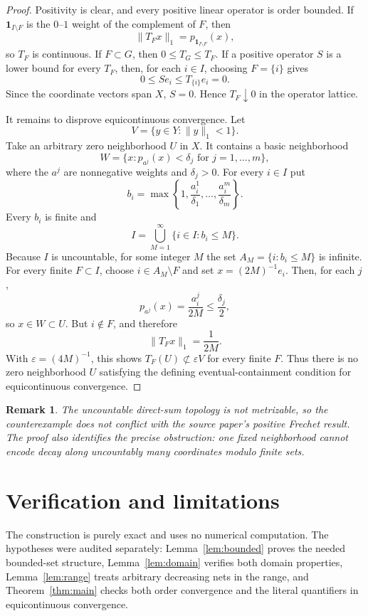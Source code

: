 \documentclass[11pt]{article}
\newtheorem{remark}[theorem]{Remark}
\begin{document}
\begin{proof}
Positivity is clear, and every positive linear operator is order bounded.  If
$\mathbf 1_{I\setminus F}$ is the $0$--$1$ weight of the complement of $F$,
then
\[
   \|T_Fx\|_1=p_{\mathbf 1_{I\setminus F}}(x),
\]
so $T_F$ is continuous.  If $F\subset G$, then $0\le T_G\le T_F$.  If a
positive operator $S$ is a lower bound for every $T_F$, then, for each
$i\in I$, choosing $F=\{i\}$ gives
\[
   0\le S e_i\le T_{\{i\}}e_i=0.
\]
Since the coordinate vectors span $X$, $S=0$.  Hence $T_F\downarrow0$ in the
operator lattice.

It remains to disprove equicontinuous convergence.  Let
\[
   V=\{y\in Y:\|y\|_1<1\}.
\]
Take an arbitrary zero neighborhood $U$ in $X$.  It contains a basic
neighborhood
\[
   W=\{x:p_{a^j}(x)<\delta_j\text{ for }j=1,\ldots,m\},
\]
where the $a^j$ are nonnegative weights and $\delta_j>0$.  For every $i\in I$
put
\[
   b_i=\max\left\{1,
      \frac{a^1_i}{\delta_1},\ldots,
      \frac{a^m_i}{\delta_m}\right\}.
\]
Every $b_i$ is finite and
\[
   I=\bigcup_{M=1}^{\infty}\{i\in I:b_i\le M\}.
\]
Because $I$ is uncountable, for some integer $M$ the set
$A_M=\{i:b_i\le M\}$ is infinite.  For every finite $F\subset I$, choose
$i\in A_M\setminus F$ and set $x=(2M)^{-1}e_i$.  Then, for each $j$,
\[
   p_{a^j}(x)=\frac{a^j_i}{2M}\le\frac{\delta_j}{2},
\]
so $x\in W\subset U$.  But $i\notin F$, and therefore
\[
   \|T_Fx\|_1=\frac{1}{2M}.
\]
With $\varepsilon=(4M)^{-1}$, this shows
$T_F(U)\not\subset\varepsilon V$ for every finite $F$.  Thus there is no
zero neighborhood $U$ satisfying the defining eventual-containment condition
for equicontinuous convergence.
\end{proof}

\begin{remark}
The uncountable direct-sum topology is not metrizable, so the counterexample
does not conflict with the source paper's positive Frechet result.  The proof
also identifies the precise obstruction: one fixed neighborhood cannot encode
decay along uncountably many coordinates modulo finite sets.
\end{remark}

\section{Verification and limitations}

The construction is purely exact and uses no numerical computation.  The
hypotheses were audited separately: Lemma~\ref{lem:bounded} proves the needed
bounded-set structure, Lemma~\ref{lem:domain} verifies both domain properties,
Lemma~\ref{lem:range} treats arbitrary decreasing nets in the range, and
Theorem~\ref{thm:main} checks both order convergence and the literal
quantifiers in equicontinuous convergence.
\end{document}
